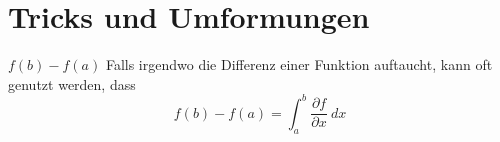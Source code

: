 \section{Tricks und Umformungen}
\begin{Rezept}{$f(b)-f(a)$}{}
Falls irgendwo die Differenz einer Funktion auftaucht, kann oft genutzt werden, dass
\[ f(b)-f(a) = \int_a^b \frac{\partial f}{\partial x} ~ dx \]
\end{Rezept}

